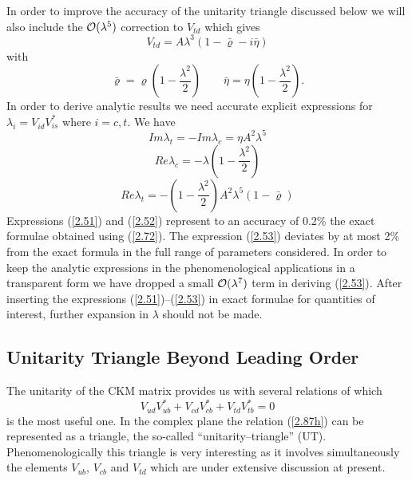 In order to improve the accuracy of the unitarity triangle discussed
below we will also include the ${\cal O}(\lambda^5)$ correction to $V_{td}$
which gives
\begin{equation}\label{2.83d}
 V_{td}= A\lambda^3 (1-\bar\varrho-i\bar\eta) 
\end{equation}
with
\begin{equation}\label{2.88d}
\bar\varrho=\varrho (1-\frac{\lambda^2}{2})
\qquad
\bar\eta=\eta (1-\frac{\lambda^2}{2}).
\end{equation}
%
In order to derive analytic results we need accurate explicit expressions
for $\lambda_i=V_{id}^{}V_{is}^*$ where $i=c,t$. We have
\begin{equation}\label{2.51}
 Im\lambda_t= -Im\lambda_c=\eta A^2\lambda^5 
\end{equation}
\begin{equation}\label{2.52}
 Re\lambda_c=-\lambda (1-\frac{\lambda^2}{2})
\end{equation}
\begin{equation}\label{2.53}
 Re\lambda_t= -(1-\frac{\lambda^2}{2}) A^2\lambda^5 (1-\bar\varrho) 
\end{equation}
Expressions (\ref{2.51}) and (\ref{2.52}) represent to an accuracy of
0.2\% the exact formulae obtained using (\ref{2.72}). The expression
(\ref{2.53}) deviates by at most 2\% from the exact formula in the
full range of parameters considered. 
In order to keep the analytic
expressions in the phenomenological applications in a transparent form
we have dropped a small ${\cal O}(\lambda^7)$ term in deriving (\ref{2.53}).
After inserting the expressions (\ref{2.51})--(\ref{2.53}) in exact
formulae for quantities of interest, further expansion in $\lambda$
should not be made. 

\subsection{Unitarity Triangle Beyond Leading Order}
            \label{sec:sewm:utriag}
The unitarity of the CKM matrix provides us with several relations
of which
\begin{equation}\label{2.87h}
V_{ud}^{}V_{ub}^* + V_{cd}^{}V_{cb}^* + V_{td}^{}V_{tb}^* =0
\end{equation}
is the most useful one.
In the complex plane the relation (\ref{2.87h}) can be represented as
a triangle, the so-called ``unitarity--triangle'' (UT).
Phenomenologically this triangle is very interesting as it involves
simultaneously the elements $V_{ub}$, $V_{cb}$ and $V_{td}$ which are
under extensive discussion at present.


